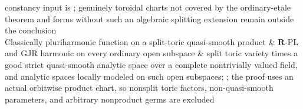 \begin{longtable}
constancy input is ; genuinely
toroidal charts not covered by the ordinary-etale theorem and forms without
such an algebraic splitting extension remain outside the conclusion \\
Classically pluriharmonic function on a split-toric quasi-smooth product &
\(\mathbf R\)-PL and GJR harmonic on every ordinary open subspace &
split toric variety times a good strict quasi-smooth analytic space over a
complete nontrivially valued field, and analytic spaces locally modeled on
such open subspaces; ; the
proof uses an actual orbitwise product chart, so nonsplit toric factors,
non-quasi-smooth parameters, and arbitrary nonproduct germs are excluded \\
\end{longtable}
\endgroup

